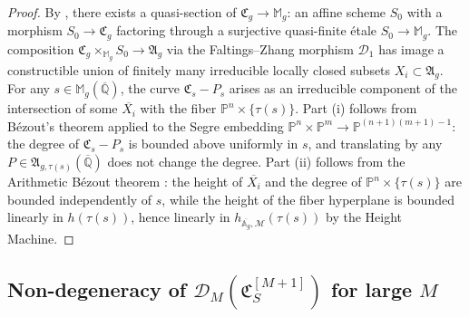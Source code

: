 \begin{proof}
  By \cite[Corollaire~17.16.3(ii)]{EGAIV}, there exists a quasi-section of
  \(\mathfrak{C}_g \to \mathbb{M}_g\): an affine scheme \(S_0\) with a morphism
  \(S_0 \to \mathfrak{C}_g\) factoring through a surjective quasi-finite étale
  \(S_0 \to \mathbb{M}_g\).
  The composition \(\mathfrak{C}_g \times_{\mathbb{M}_g} S_0 \to \mathfrak{A}_g\)
  via the Faltings--Zhang morphism \(\mathscr{D}_1\) has image a constructible
  union of finitely many irreducible locally closed subsets \(X_i \subset \mathfrak{A}_g\).
  For any \(s \in \mathbb{M}_g(\overline{\mathbb{Q}})\), the curve \(\mathfrak{C}_s - P_s\)
  arises as an irreducible component of the intersection of some \(\overline{X_i}\)
  with the fiber \(\mathbb{P}^n \times \{\tau(s)\}\).
  Part (i) follows from Bézout's theorem applied to the Segre embedding
  \(\mathbb{P}^n \times \mathbb{P}^m \to \mathbb{P}^{(n+1)(m+1)-1}\):
  the degree of \(\mathfrak{C}_s - P_s\) is bounded above uniformly in \(s\),
  and translating by any \(P \in \mathfrak{A}_{g,\tau(s)}(\overline{\mathbb{Q}})\)
  does not change the degree.
  Part (ii) follows from the Arithmetic Bézout theorem \cite[Théorème~3]{HauteursAlt3}:
  the height of \(\overline{X_i}\) and the degree of \(\mathbb{P}^n \times \{\tau(s)\}\)
  are bounded independently of \(s\), while the height of the fiber hyperplane is
  bounded linearly in \(h(\tau(s))\), hence linearly in
  \(h_{\overline{\mathbb{A}_g},\mathcal{M}}(\tau(s))\) by the Height Machine.
\end{proof}

\subsection{Non-degeneracy of $\mathscr{D}_M(\mathfrak{C}_S^{[M+1]})$ for large $M$}

